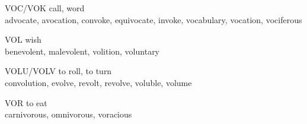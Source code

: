 \begin{flashcard}[Roots]{VOC/VOK}
call, word\\
\vspace{0.2in}
advocate, avocation, convoke, equivocate, invoke, vocabulary, vocation, vociferous\\
\end{flashcard}

\begin{flashcard}[Roots]{VOL}
wish\\
\vspace{0.2in}
benevolent, malevolent, volition, voluntary\\
\end{flashcard}

\begin{flashcard}[Roots]{VOLU/VOLV}
to roll, to turn\\
\vspace{0.2in}
convolution, evolve, revolt, revolve, voluble, volume\\
\end{flashcard}

\begin{flashcard}[Roots]{VOR}
to eat\\
\vspace{0.2in}
carnivorous, omnivorous, voracious\\
\end{flashcard}




